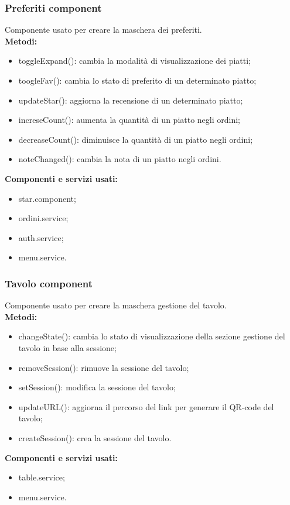 \subsubsection{Preferiti component}
Componente usato per creare la maschera dei preferiti.\\
\textbf{Metodi:}
\begin{itemize}
    \item toggleExpand(): cambia la modalità di visualizzazione dei piatti;
    \item toogleFav(): cambia lo stato di preferito di un determinato piatto;
    \item updateStar(): aggiorna la recensione di un determinato piatto;
    \item increseCount(): aumenta la quantità di un piatto negli ordini;
    \item decreaseCount(): diminuisce la quantità di un piatto negli ordini;
    \item noteChanged(): cambia la nota di un piatto negli ordini.
\end{itemize}
\textbf{Componenti e servizi usati:}
\begin{itemize}
    \item star.component;
    \item ordini.service;
    \item auth.service;
    \item menu.service.
\end{itemize}

\subsubsection{Tavolo component}
Componente usato per creare la maschera gestione del tavolo.\\
\textbf{Metodi:}
\begin{itemize}
    \item changeState(): cambia lo stato di visualizzazione della sezione gestione del tavolo in base alla sessione;
    \item removeSession(): rimuove la sessione del tavolo;
    \item setSession(): modifica la sessione del tavolo;
    \item updateURL(): aggiorna il percorso del link per generare il QR-code del tavolo;
    \item createSession(): crea la sessione del tavolo.
\end{itemize}
\textbf{Componenti e servizi usati:}
\begin{itemize}
    \item table.service;
    \item menu.service.
\end{itemize}

